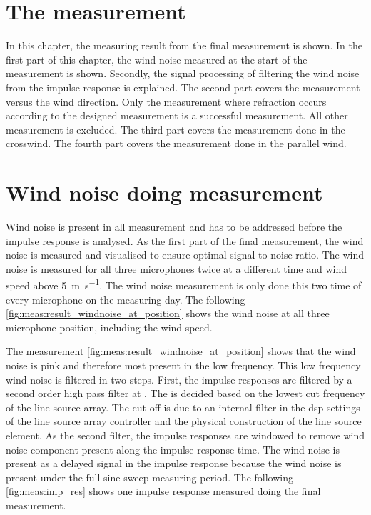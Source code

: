 \section{The measurement}\label{meas:meas_of_kudo}
In this chapter, the measuring result from the final measurement is shown. In the first part of this chapter, the wind noise measured at the start of the measurement is shown. Secondly, the signal processing of filtering the wind noise from the impulse response is explained. The second part covers the measurement versus the wind direction. Only the measurement where refraction occurs according to the designed measurement is a successful measurement. All other measurement is excluded. The third part covers the measurement done in the crosswind. The fourth part covers the measurement done in the parallel wind. 


\section{Wind noise doing measurement}\label{mes:kudo:wind_noise}
Wind noise is present in all measurement and has to be addressed before the impulse response is analysed. As the first part of the final measurement, the wind noise is measured and visualised to ensure optimal signal to noise ratio. The wind noise is measured for all three microphones twice at a different time and wind speed above \SI{5}{\meter\per\second}. The wind noise measurement is only done this two time of every microphone on the measuring day. The following \autoref{fig:meas:result_windnoise_at_position} shows the wind noise at all three microphone position, including the wind speed.



The measurement \autoref{fig:meas:result_windnoise_at_position} shows that the wind noise is pink and therefore most present in the low frequency. This low frequency wind noise is filtered in two steps. First, the impulse responses are filtered by a second order high pass filter at .  The  is decided based on the lowest cut frequency of the line source array. The cut off is due to an internal filter in the \gls{dsp} settings of the line source array controller and the physical construction of the line source element. As the second filter, the impulse responses are windowed to remove wind noise component present along the impulse response time. The wind noise is present as a delayed signal in the impulse response because the wind noise is present under the full sine sweep measuring period. The following \autoref{fig:meas:imp_res} shows one impulse response measured doing the final measurement.

